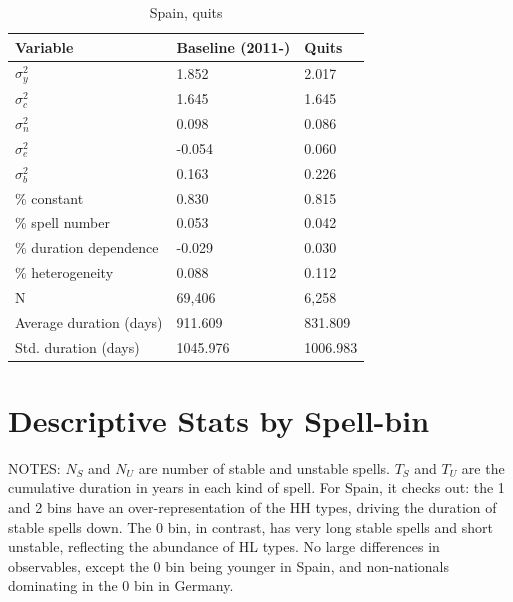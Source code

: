 \documentclass[12pt]{article}
\theoremstyle{definition}
\theoremstyle{remark}
\begin{document}
\begin{appendices}
\begin{table}[htbb!]\label{tab:results_spain_Quits}
    \centering
    \caption{Spain, quits}
\begin{tabular}{lll}
\toprule
Variable & Baseline (2011-) & Quits \\
\midrule
$\sigma^{2}_y$ & 1.852 & 2.017 \\
$\sigma^{2}_c$ & 1.645 & 1.645 \\
$\sigma^{2}_n$ & 0.098 & 0.086 \\
$\sigma^{2}_e$ & -0.054 & 0.060 \\
$\sigma^{2}_b$ & 0.163 & 0.226 \\
\midrule
\% constant & 0.830 & 0.815 \\
\% spell number & 0.053 & 0.042 \\
\% duration dependence & -0.029 & 0.030 \\
\% heterogeneity & 0.088 & 0.112 \\
\hline \hline
N & 69,406 & 6,258 \\
Average duration (days) & 911.609 & 831.809 \\
Std. duration (days) & 1045.976 & 1006.983 \\
\bottomrule
\end{tabular}
\end{table}

\section{Descriptive Stats by Spell-bin}

\textcolor{uv}{NOTES: $N_S$ and $N_U$ are number of stable and unstable spells. $T_S$ and $T_U$ are the cumulative duration in years in each kind of spell. For Spain, it checks out: the 1 and 2 bins have an over-representation of the HH types, driving the duration of stable spells down. The 0 bin, in contrast, has very long stable spells and short unstable, reflecting the abundance of HL types. No large differences in observables, except the 0 bin being younger in Spain, and non-nationals dominating in the 0 bin in Germany.}


\end{appendices}
\end{document}
